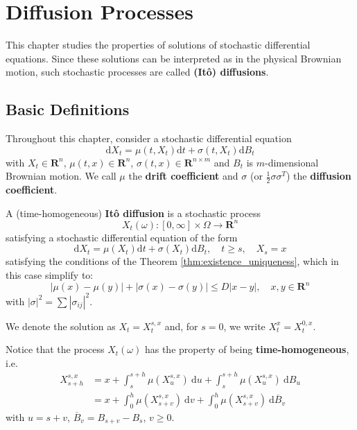 \chapter{Diffusion Processes}

This chapter studies the properties of solutions of stochastic differential equations. Since these solutions can be interpreted as in the physical Brownian motion, such stochastic processes are called \textbf{(Itô) diffusions}. 

\section{Basic Definitions}

Throughout this chapter, consider a stochastic differential equation 
\begin{equation}\label{eq:202301231650}
    \mathrm{d} X_t = \mu(t, X_t) \mathrm{d}t + \sigma(t, X_t) \mathrm{d}B_t
\end{equation}
with $X_t \in \textbf{R}^n$, $\mu(t,x) \in \textbf{R}^n$, $\sigma(t,x) \in \textbf{R}^{n \times m}$ and $B_t$ is $m$-dimensional Brownian motion. We call $\mu$ the \textbf{drift coefficient} and $\sigma$ (or $\frac{1}{2} \sigma \sigma^T$) the \textbf{diffusion coefficient}. 

\begin{definition}
    A (time-homogeneous) \textbf{Itô diffusion} is a stochastic process 
    \[
        X_t(\omega) : [0, \infty] \times \Omega \longrightarrow \textbf{R}^n
    \]
    satisfying a stochastic differential equation of the form 
    \begin{equation*}
        \mathrm{d} X_t = \mu(X_t) \mathrm{d}t + \sigma(X_t) \mathrm{d}B_t, \quad t \geq s, \quad X_s = x
    \end{equation*}
    satisfying the conditions of the Theorem \ref{thm:existence_uniqueness}, which in this case simplify to: 
    \begin{equation*}
        |\mu(x) - \mu(y)| + |\sigma(x) - \sigma(y)| \leq D|x-y|, \quad x, y \in \textbf{R}^n
    \end{equation*}
    with $|\sigma|^2 = \sum |\sigma_{ij}|^2$. 

    We denote the solution as $X_t = X_t^{s,x}$ and, for $s = 0$, we write $X_t^x = X_t^{0,x}$.
\end{definition}

Notice that the process $X_t(\omega)$ has the property of being \textbf{time-homogeneous}, i.e. 
\begin{equation*}
    \begin{aligned}
        X_{s+h}^{s,x} &= x + \int_s^{s+h} \mu(X_u^{s,x})~\mathrm{d}u + \int_s^{s+h} \mu(X_u^{s,x})~\mathrm{d}B_u \\
        &= x + \int_0^{h} \mu(X_{s+v}^{s,x})~\mathrm{d}v + \int_0^{h} \mu(X_{s+v}^{s,x})~\mathrm{d}\overline{B}_v
    \end{aligned} 
\end{equation*}
with $u = s+v$, $\overline{B}_v = B_{s+v} - B_s$, $v \geq 0$. 

